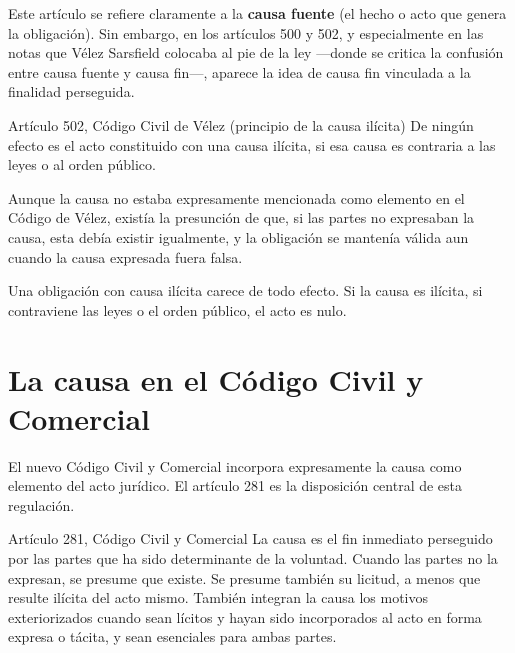 \documentclass[12pt,oneside]{book}
\begin{document}
Este artículo se refiere claramente a la \textbf{causa fuente} (el hecho o acto que genera la obligación). Sin embargo, en los artículos 500 y 502, y especialmente en las notas que Vélez Sarsfield colocaba al pie de la ley —donde se critica la confusión entre causa fuente y causa fin—, aparece la idea de causa fin vinculada a la finalidad perseguida.

\begin{definition}{Artículo 502, Código Civil de Vélez (principio de la causa ilícita)}
De ningún efecto es el acto constituido con una causa ilícita, si esa causa es contraria a las leyes o al orden público.
\end{definition}

Aunque la causa no estaba expresamente mencionada como elemento en el Código de Vélez, existía la presunción de que, si las partes no expresaban la causa, esta debía existir igualmente, y la obligación se mantenía válida aun cuando la causa expresada fuera falsa.

\begin{important}
Una obligación con causa ilícita carece de todo efecto. Si la causa es ilícita, si contraviene las leyes o el orden público, el acto es nulo.
\end{important}


\section{La causa en el Código Civil y Comercial}

El nuevo Código Civil y Comercial incorpora expresamente la causa como elemento del acto jurídico. El artículo 281 es la disposición central de esta regulación.

\begin{definition}{Artículo 281, Código Civil y Comercial}
La causa es el fin inmediato perseguido por las partes que ha sido determinante de la voluntad. Cuando las partes no la expresan, se presume que existe. Se presume también su licitud, a menos que resulte ilícita del acto mismo. También integran la causa los motivos exteriorizados cuando sean lícitos y hayan sido incorporados al acto en forma expresa o tácita, y sean esenciales para ambas partes.
\end{definition}
\end{document}
